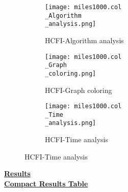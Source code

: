\documentclass[10pt]{article}
\begin{document}
\graphicspath{{./Core1/Solutions/HCFI/miles1000.col}}
\begin{figure}[H]
\begin{subfigure}{.33\textwidth}
  \centering
  \texttt{[image: miles1000.col\\\_Algorithm\\\_analysis.png]}
  \caption{HCFI-Algorithm analysis}
   \label{fig:subfig1}
\end{subfigure}%
\begin{subfigure}{.33\textwidth}
  \centering
  \texttt{[image: miles1000.col\\\_Graph\\\_coloring.png]}
  \caption{HCFI-Graph coloring}
  \label{fig:subfig2}
\end{subfigure}
\begin{subfigure}{.33\textwidth}
  \centering
  \texttt{[image: miles1000.col\\\_Time\\\_analysis.png]}
  \caption{HCFI-Time analysis}
  \end{subfigure}
\end{figure}
\vspace{2cm}
\begin{center}
\hyperlink{page.8}{\textbf{Results}}\\
\vspace{0.5cm}
\hyperlink{page.71}{\textbf{Compact Results Table}}
\end{center}
\pagebreak
\end{document}
